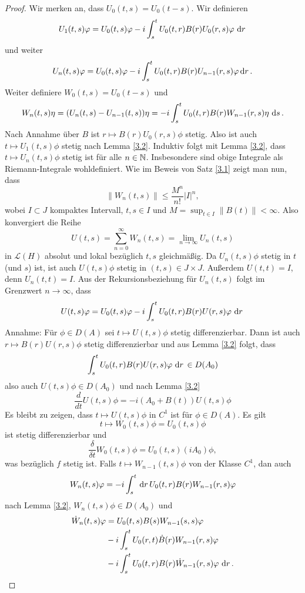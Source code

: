 \documentclass{mycourse}
\begin{document}
\begin{proof}
Wir merken an, dass $U_0(t,s)=U_0(t-s)$. Wir definieren
\[
U_1(t,s)\phi= U_0(t,s)\phi-i \int_s^t U_0(t,r) B(r) U_0(r,s) \phi\, \dx[r]
\]
und weiter
\[
U_n(t,s) \phi = U_0(t,s) \phi-i \int_s^t U_0(t,r) B(r) U_{n-1}(r,s) \phi \dx[r].
\]
Weiter definiere $W_0(t,s)=U_0(t-s)$  und 
\[
W_n(t,s)\eta= (U_n(t,s)-U_{n-1}(t,s))\eta= -i \int_s^t U_0(t,r) B(r) W_{n-1} (r,s) \eta \, \dx[s].
\] 
Nach Annahme über $B$ ist $r\mapsto B(r) U_0(r,s) \phi$ stetig. Also ist auch $t\mapsto U_1(t,s) \phi$ stetig nach Lemma \ref{3.2}.  Induktiv folgt mit Lemma \ref{3.2}, dass $t\mapsto U_n(t,s) \phi$ stetig ist für alle $n\in \N$. Insbesondere sind obige Integrale als Riemann-Integrale wohldefiniert. Wie im Beweis von Satz \ref{3.1} zeigt man nun, dass
\[
\|W_n(t,s)\| \le \frac{M^n}{n!} |I|^n,
\]
wobei $I\subset J$ kompaktes Intervall, $t,s\in I$ und $M=\sup_{t\in I} \| B(t) \| < \infty$. Also konvergiert die Reihe
\[
U(t,s)=\sum_{n=0}^\infty W_n(t,s)=\lim_{n\to \infty} U_n(t,s)
\]
in $\mathcal L(H)$ absolut und lokal bezüglich $t,s$ gleichmäßig. Da $U_n(t,s) \phi$ stetig in $t$ (und $s$) ist, ist auch $U(t,s)\phi$ stetig in $(t,s)\in J\times J$. Außerdem $U(t,t)=I$, denn $U_n(t,t)=I$.
Aus der Rekursionsbeziehung für $U_n(t,s)$ folgt im Grenzwert $n\to \infty$, dass
\[
U(t,s) \phi= U_0(t,s)\phi-i \int_s^t U_0(t,r) B(r) U(r,s) \phi\, \dx[r]
\]
Annahme: Für $\phi \in D(A)$ sei $t\mapsto U(t,s) \phi$ stetig differenzierbar. Dann ist auch $r\mapsto B(r) U(r,s) \phi$ stetig differenzierbar und aus Lemma \ref{3.2} folgt, dass
\[
\int_s^t U_0(t,r) B(r) U(r,s) \phi \, \dx[r] \in D(A_0)
\]
also auch $U(t,s)\phi \in D(A_0)$ und nach Lemma \ref{3.2}
\[
\frac{d}{dt} U(t,s) \phi=-i (A_0 +B(t)) U(t,s) \phi
\]
Es bleibt zu zeigen, dass $t\mapsto U(t,s)\phi$ in $C^1$ ist für $\phi\in D(A)$. Es gilt
\[
t \mapsto W_0(t,s) \phi = U_0(t,s) \phi
\]
ist stetig differenzierbar und
\[
\frac{\delta}{\delta t} W_0(t,s) \phi = U_0(t,s) (iA_0) \phi,
\]
was bezüglich $f$ stetig ist. Falls $t\mapsto W_{n-1} (t,s) \phi$ von der Klasse $C^1$, dan auch
\[
W_n(t,s) \phi=-i \int_s^t \dx[r] U_0(t,r) B(r) W_{n-1}(r,s) \phi
\]
nach Lemma \ref{3.2}, $W_n(t,s) \phi \in D(A_0)$ und
\begin{align*}
\dot W_n(t,s) \phi &= U_0(t,s) B(s) W_{n-1}(s, s) \phi\\
&- i\int_s^t U_0(r,t) \dot B(r) W_{n-1}(r,s) \phi \\
& -i\int_s^t U_0(t,r) B(r) \dot W_{n-1} (r,s) \phi \, \dx[r]. 
\end{align*}


\end{proof}
\end{document}
